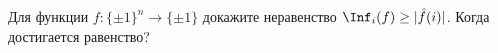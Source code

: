 Для функции $f\colon \{\pm 1\}^n \to \{\pm 1\}$ докажите неравенство $\Inf_i(f) \ge |\hat{f}(i)|$. Когда
достигается равенство?
